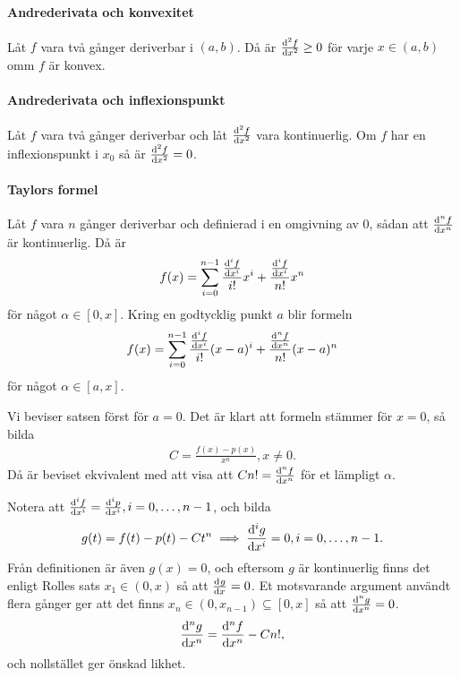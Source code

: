 \proof

\paragraph{Andrederivata och konvexitet}
Låt $f$ vara två gånger deriverbar i $(a, b)$. Då är $\dv[2]{f}{x} (x)\geq 0$ för varje $x\in (a, b)$ omm $f$ är konvex.

\proof

\paragraph{Andrederivata och inflexionspunkt}
Låt $f$ vara två gånger deriverbar och låt $\dv[2]{f}{x}$ vara kontinuerlig. Om $f$ har en inflexionspunkt i $x_0$ så är $\dv[2]{f}{x} (x_0) = 0$.

\proof

\paragraph{Taylors formel}
Låt $f$ vara $n$ gånger deriverbar och definierad i en omgivning av $0$, sådan att $\dv[n]{f}{x}$ är kontinuerlig. Då är
\begin{align*}
	f(x) = \sum\limits_{i = 0}^{n - 1}\frac{\dv[i]{f}{x} (0)}{i!}x^i + \frac{\dv[i]{f}{x} (\alpha)}{n!}x^n
\end{align*}
för något $\alpha\in [0, x]$. Kring en godtycklig punkt $a$ blir formeln
\begin{align}
	f(x) = \sum\limits_{i = 0}^{n - 1}\frac{\dv[i]{f}{x} (a)}{i!}(x - a)^i + \frac{\dv[n]{f}{x} (\alpha)}{n!}(x - a)^n
	\label{eq:taylor_formula}
\end{align}
för något $\alpha\in [a, x]$.

\proof
Vi beviser satsen först för $a = 0$. Det är klart att formeln stämmer för $x = 0$, så bilda
\begin{align*}
	C = \frac{f(x) - p(x)}{x^n}, x\neq 0.
\end{align*}
Då är beviset ekvivalent med att visa att $Cn! = \dv[n]{f}{x} (\alpha)$ för et lämpligt $\alpha$.

Notera att $\dv[i]{f}{x} (0) = \dv[i]{p}{x} (0), i = 0, \dots, n - 1$, och bilda
\begin{align*}
	g(t) = f(t) - p(t) - Ct^n\implies \dv[i]{g}{x} (0) = 0, i = 0, \dots, n - 1.
\end{align*}
Från definitionen är även $g(x) = 0$, och eftersom $g$ är kontinuerlig finns det enligt Rolles sats $x_1\in (0, x)$ så att $\dv[]{g}{x} (x_1) = 0$. Et motsvarande argument användt flera gånger ger att det finns $x_n\in (0, x_{n - 1})\subseteq [0, x]$ så att $\dv[n]{g}{x} (x_n) = 0$.
\begin{align*}
	\dv[n]{g}{x} (x_n) = \dv[n]{f}{x} (x_n) - Cn!,
\end{align*}
och nollstället ger önskad likhet.

